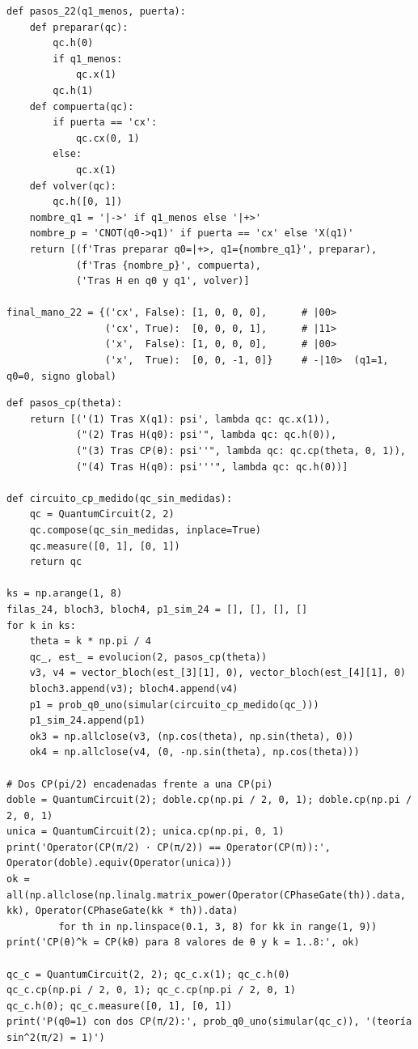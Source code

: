 \begin{lstlisting}[caption={Ejercicio 2.2: pasos del circuito con CNOT o con $X$ sobre $q_1$.},label={lst:b2_cnot}]
def pasos_22(q1_menos, puerta):
    def preparar(qc):
        qc.h(0)
        if q1_menos:
            qc.x(1)
        qc.h(1)
    def compuerta(qc):
        if puerta == 'cx':
            qc.cx(0, 1)
        else:
            qc.x(1)
    def volver(qc):
        qc.h([0, 1])
    nombre_q1 = '|->' if q1_menos else '|+>'
    nombre_p = 'CNOT(q0->q1)' if puerta == 'cx' else 'X(q1)'
    return [(f'Tras preparar q0=|+>, q1={nombre_q1}', preparar),
            (f'Tras {nombre_p}', compuerta),
            ('Tras H en q0 y q1', volver)]

final_mano_22 = {('cx', False): [1, 0, 0, 0],      # |00>
                 ('cx', True):  [0, 0, 0, 1],      # |11>
                 ('x',  False): [1, 0, 0, 0],      # |00>
                 ('x',  True):  [0, 0, -1, 0]}     # -|10>  (q1=1, q0=0, signo global)
\end{lstlisting}

\begin{lstlisting}[caption={Ejercicios 2.3 y 2.4: pasos con $CP(\theta)$, barrido de $\theta$ y comprobación de $CP(\theta)^k=CP(k\theta)$.},label={lst:b2_barrido}]
def pasos_cp(theta):
    return [('(1) Tras X(q1): psi', lambda qc: qc.x(1)),
            ("(2) Tras H(q0): psi'", lambda qc: qc.h(0)),
            ("(3) Tras CP(θ): psi''", lambda qc: qc.cp(theta, 0, 1)),
            ("(4) Tras H(q0): psi'''", lambda qc: qc.h(0))]

def circuito_cp_medido(qc_sin_medidas):
    qc = QuantumCircuit(2, 2)
    qc.compose(qc_sin_medidas, inplace=True)
    qc.measure([0, 1], [0, 1])
    return qc

ks = np.arange(1, 8)
filas_24, bloch3, bloch4, p1_sim_24 = [], [], [], []
for k in ks:
    theta = k * np.pi / 4
    qc_, est_ = evolucion(2, pasos_cp(theta))
    v3, v4 = vector_bloch(est_[3][1], 0), vector_bloch(est_[4][1], 0)
    bloch3.append(v3); bloch4.append(v4)
    p1 = prob_q0_uno(simular(circuito_cp_medido(qc_)))
    p1_sim_24.append(p1)
    ok3 = np.allclose(v3, (np.cos(theta), np.sin(theta), 0))
    ok4 = np.allclose(v4, (0, -np.sin(theta), np.cos(theta)))

# Dos CP(pi/2) encadenadas frente a una CP(pi)
doble = QuantumCircuit(2); doble.cp(np.pi / 2, 0, 1); doble.cp(np.pi / 2, 0, 1)
unica = QuantumCircuit(2); unica.cp(np.pi, 0, 1)
print('Operator(CP(π/2) · CP(π/2)) == Operator(CP(π)):', Operator(doble).equiv(Operator(unica)))
ok = all(np.allclose(np.linalg.matrix_power(Operator(CPhaseGate(th)).data, kk), Operator(CPhaseGate(kk * th)).data)
         for th in np.linspace(0.1, 3, 8) for kk in range(1, 9))
print('CP(θ)^k = CP(kθ) para 8 valores de θ y k = 1..8:', ok)

qc_c = QuantumCircuit(2, 2); qc_c.x(1); qc_c.h(0)
qc_c.cp(np.pi / 2, 0, 1); qc_c.cp(np.pi / 2, 0, 1)
qc_c.h(0); qc_c.measure([0, 1], [0, 1])
print('P(q0=1) con dos CP(π/2):', prob_q0_uno(simular(qc_c)), '(teoría sin^2(π/2) = 1)')
\end{lstlisting}

